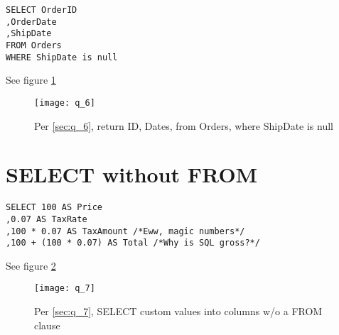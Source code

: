 \documentclass{article}
\begin{document}
\begin{lstlisting}[float]
SELECT OrderID
,OrderDate
,ShipDate
FROM Orders
WHERE ShipDate is null
\end{lstlisting}\label{sec:q_6}
See figure \ref{fig:q_6}

\begin{figure}[H]\centering
	\caption{Per \ref{sec:q_6}, return ID, Dates, from Orders, where
	ShipDate is null}
	\texttt{[image: q\_6]}
	\label{fig:q_6}
\end{figure}

\section{SELECT without FROM}

\begin{lstlisting}[float]
SELECT 100 AS Price
,0.07 AS TaxRate
,100 * 0.07 AS TaxAmount /*Eww, magic numbers*/
,100 + (100 * 0.07) AS Total /*Why is SQL gross?*/
\end{lstlisting}\label{sec:q_7}
See figure \ref{fig:q_7}

\begin{figure}[H]\centering
	\caption{Per \ref{sec:q_7}, SELECT custom values into columns w/o a
	FROM clause}
	\texttt{[image: q\_7]}
	\label{fig:q_7}
\end{figure}
\end{document}

